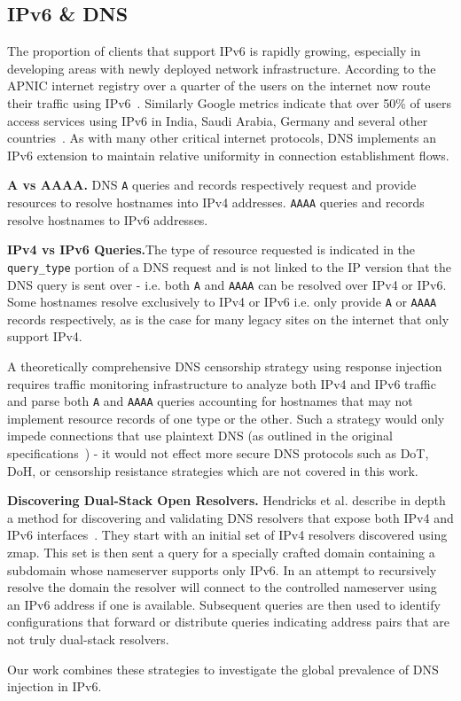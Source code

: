 \subsection{IPv6 \& DNS}
\label{subsec:v4vsv6}

The proportion of clients that support IPv6 is rapidly growing, especially in
developing areas with newly deployed network infrastructure.
According to the APNIC internet registry over a quarter of the users
on the internet now route their traffic using IPv6~\cite{Huston-APNIC2021}.
Similarly Google metrics indicate that over 50\% of users access services using
IPv6 in India, Saudi Arabia, Germany and several other countries~\cite{Google-IPv6}.
As with many other critical internet protocols, DNS implements an IPv6 extension
to maintain relative uniformity in connection establishment flows.

\textbf{A vs AAAA.} DNS \texttt{A} queries and records respectively request and provide
resources to resolve hostnames into IPv4 addresses. \texttt{AAAA} queries and
records resolve hostnames to IPv6 addresses.

\textbf{IPv4 vs IPv6 Queries.}The type of resource requested is
indicated in the \texttt{query\_type} portion of a DNS request and is not linked
to the IP version that the DNS query is sent over - i.e. both \texttt{A} and
\texttt{AAAA} can be resolved over IPv4 or IPv6.
Some hostnames resolve exclusively to IPv4 or IPv6 i.e. only provide \texttt{A}
or \texttt{AAAA} records respectively, as is the case for many legacy sites on
the internet that only support IPv4.

A theoretically comprehensive DNS censorship strategy using response injection
requires traffic monitoring infrastructure to analyze both IPv4 and IPv6
traffic and parse both \texttt{A} and \texttt{AAAA} queries accounting for hostnames
that may not implement resource records of one type or the other. Such a strategy
would only impede connections that use plaintext DNS (as outlined in the
original specifications~\cite{RFC1035,RFC3596}) - it would not effect more secure DNS
protocols such as DoT, DoH, or censorship resistance strategies which are not
covered in this work.

\textbf{Discovering Dual-Stack Open Resolvers.}
Hendricks et al. describe in depth a method for discovering and validating DNS
resolvers that expose both IPv4 and IPv6 interfaces~\cite{hendriks2017potential}.
They start with an initial
set of IPv4 resolvers discovered using zmap. This set is then sent a query for a
specially crafted domain containing a subdomain whose nameserver supports only
IPv6. In an attempt to recursively resolve the domain the resolver will connect
to the controlled nameserver using an IPv6 address if one is available.
Subsequent queries are then used to identify configurations that forward or
distribute queries indicating address pairs that are not truly dual-stack resolvers.

Our work combines these strategies to investigate the global prevalence of DNS
injection in IPv6.
